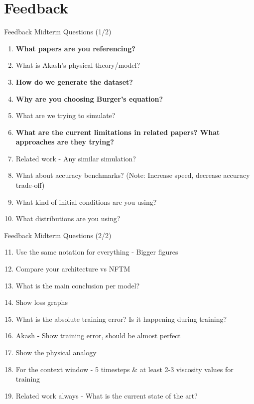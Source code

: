 \section{Feedback}

\begin{frame}{Feedback}
    \small
    \textcolor{red_unipd}{\Large Midterm Questions (1/2)}
    \vspace{0.3em}

    \scriptsize
    \begin{enumerate}
        \item \textbf{What papers are you referencing?}
        \item What is Akash's physical theory/model?
        \item \textbf{How do we generate the dataset?}
        \item \textbf{Why are you choosing Burger's equation?}
        \item What are we trying to simulate?
        \item \textbf{What are the current limitations in related papers? What approaches are they trying?}
        \item Related work - Any similar simulation?
        \item What about accuracy benchmarks? (Note: Increase speed, decrease accuracy trade-off)
        \item What kind of initial conditions are you using?
        \item What distributions are you using?
    \end{enumerate}
\end{frame}

\begin{frame}{Feedback}
    \small
    \textcolor{red_unipd}{\Large Midterm Questions (2/2)}
    \vspace{0.3em}

    \scriptsize
    \begin{enumerate}
        \setcounter{enumi}{10}
        \item Use the same notation for everything - Bigger figures
        \item Compare your architecture vs NFTM
        \item What is the main conclusion per model?
        \item Show loss graphs
        \item What is the absolute training error? Is it happening during training?
        \item Akash - Show training error, should be almost perfect
        \item Show the physical analogy
        \item For the context window - 5 timesteps \& at least 2-3 viscosity values for training
        \item Related work always - What is the current state of the art?
    \end{enumerate}
\end{frame}

